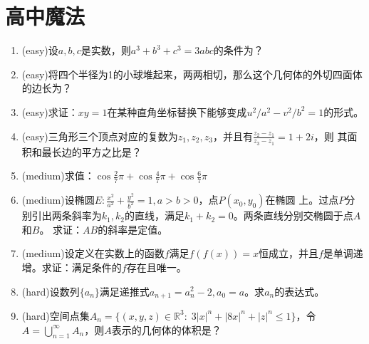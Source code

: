 \documentclass[a4paper]{article}
\begin{document}
\section{高中魔法}
\begin{enumerate}
\item (easy)设$a,b,c$是实数，则$a^3+b^3+c^3=3abc$的条件为？
\item (easy)将四个半径为1的小球堆起来，两两相切，那么这个几何体的外切四面体的边长为？
\item (easy)求证：$xy=1$在某种直角坐标替换下能够变成$u^2/a^2-v^2/b^2=1$的形式。
\item (easy)三角形三个顶点对应的复数为$z_1,z_2,z_3$，并且有$\frac{z_2-z_1}{z_3-z_1}=1+2i$，则
其面积和最长边的平方之比是？
\item (medium)求值：$\cos\frac{2}{7}\pi+\cos\frac{4}{7}\pi+\cos\frac{6}{7}\pi$
\item (medium)设椭圆$E:\frac{x^2}{a^2}+\frac{y^2}{b^2}=1,a>b>0$，点$P(x_0,y_0)$在椭圆
上。过点$P$分别引出两条斜率为$k_1,k_2$的直线，满足$k_1+k_2=0$。两条直线分别交椭圆于点$A$和$B$。
求证：$AB$的斜率是定值。
\item (medium)设定义在实数上的函数$f$满足$f(f(x))=x$恒成立，并且$f$是单调递增。求证：满足条件的$f$存在且唯一。
\item (hard)设数列$\{a_n\}$满足递推式$a_{n+1}=a_n^2-2,a_0=a$。求$a_n$的表达式。
\item (hard)空间点集$A_n=\{(x,y,z)\in\mathbb{R}^3:\; 3|x|^n+|8x|^n+|z|^n \leqslant 1\}$，令
$A=\bigcup_{n=1}^{\infty}A_n$，则$A$表示的几何体的体积是？
\end{enumerate}
\end{document}
